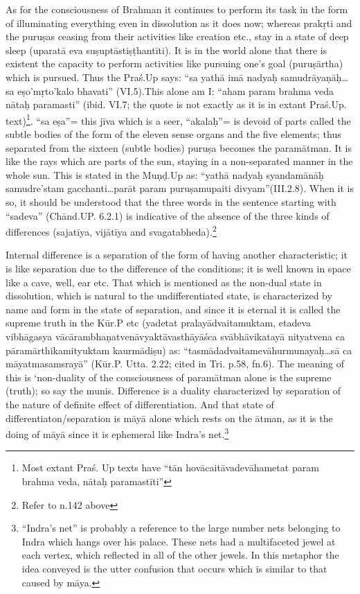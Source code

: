 As for the consciousness of Brahman it continues to perform its task in the form of illuminating everything even in dissolution as it does now; whereas prakṛti and the puruṣas ceasing from their activities like creation etc., stay in a state of deep sleep (uparatā eva suṣuptāstiṣṭhantīti). It is in the world alone that there is existent the capacity to  perform activities like pursuing one’s goal (puruṣārtha)  which is pursued. Thus the Praś.Up says: “sa yathā imā nadyaḥ samudrāyaṇāḥ…sa eṣo’mṛto’kalo bhavati” (VI.5).This alone am I: “aham param brahma veda nātaḥ paramasti” (ibid. VI.7; the quote is not exactly as it is in extant Praś.Up. text)\footnote{Most extant Praś. Up texts have “tān hovācaitāvadevāhametat param brahma veda, nātaḥ paramastīti”}. “sa eṣa”= this jīva which is a  seer, “akalaḥ”= is devoid of parts called the subtle bodies of the form of the eleven sense organs and the five elements; thus separated from the sixteen (subtle bodies) puruṣa becomes the paramātman. It is like the rays which are parts of the sun, staying in a non-separated manner in the whole sun. This is stated in the Muṇḍ.Up as: “yathā nadyaḥ syandamānāḥ samudre’stam gacchanti…parāt param puruṣamupaiti divyam”(III.2.8). When it is so, it should be understood that the three words in the sentence starting with “sadeva” (Chānd.UP. 6.2.1) is indicative of the absence of the three kinds of differences (sajatīya, vijātīya and svagatabheda).\footnote{Refer to n.142 above} 

Internal difference is a separation of the form of having another characteristic; it is like separation due to the difference of the conditions; it is well known in space like a cave, well, ear etc. That which is mentioned as the non-dual state in dissolution, which is natural to the undifferentiated state, is characterized by name and form in the state of separation, and since it is eternal it is called the supreme truth in the Kūr.P etc (yadetat pralayādvaitamuktam, etadeva vibhāgasya vācāram\-bhaṇatvenāvyaktāvasthāyāśca svābhāvikatayā nityatvena ca pāramā\-rthikamityuktam kaurmādiṣu) as: “tasmādadvaitamevāhurmunayaḥ…\-sā ca māyatmasamsrayā” (Kūr.P. Utta. 2.22; cited in Tri. p.58, fn.6).  The meaning of this is ‘non-duality of the consciousness of paramātman alone is the supreme (truth); so say the munis. Difference is a duality characterized by separation of the nature of definite effect of differentiation. And that state of differentiaton/separation is māyā alone which rests on the ātman, as it is the doing of māyā since it is ephemeral like Indra’s net.\footnote{``Indra's net'' is probably a reference to the large number nets belonging to Indra which hangs over his palace. These nets had a multifaceted jewel at each vertex, which reflected in all of the other jewels. In this metaphor the idea conveyed is the utter confusion that occurs which is similar to that caused by māya.} 

